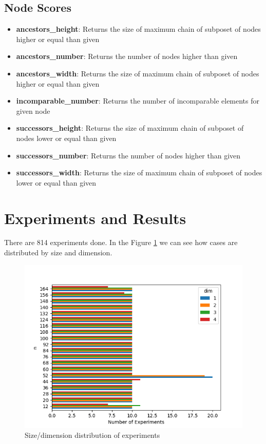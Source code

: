 \documentclass{article}
\begin{document}
\subsection{Node Scores}
\begin{itemize}
\item \textbf{ancestors\_height}: Returns the size of maximum chain of subposet of nodes higher or equal than given
\item \textbf{ancestors\_number}: Returns the number of nodes higher than given
\item \textbf{ancestors\_width}: Returns the size of maximum chain of subposet of nodes higher or equal than given
\item \textbf{incomparable\_number}: Returns the number of incomparable elements for given node
\item \textbf{successors\_height}: Returns the size of maximum chain of subposet of nodes lower or equal than given
\item \textbf{successors\_number}: Returns the number of nodes higher than given
\item \textbf{successors\_width}: Returns the size of maximum chain of subposet of nodes lower or equal than given
\end{itemize}

\section{Experiments and Results}
\par There are 814 experiments done. In the Figure \ref{fig:cases_distribution} we can see how cases are distributed by size and dimension.
\begin{figure}[ht]
  \centering
  \includegraphics[width=\textwidth]{pics/scores - cases.png}
  \caption{Size/dimension distribution of experiments}
  \label{fig:cases_distribution}
\end{figure}
\end{document}
